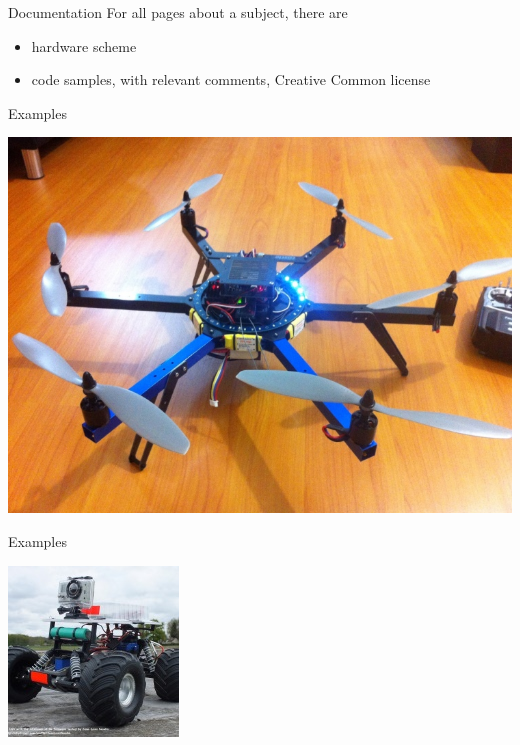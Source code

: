 \begin {frame} {Documentation}
	For all pages about a subject, there are
	\begin{itemize}
		\item hardware scheme
		\item code samples, with relevant comments, Creative Common license
	\end{itemize}
\end {frame}

\begin {frame} {Examples}
	\begin {center}
		\includegraphics [width=.7\textwidth,keepaspectratio] {img/drone}
	\end {center}
\end {frame}

\begin {frame} {Examples}
	\begin {center}
		\includegraphics [width=.5\textwidth,keepaspectratio] {img/rover}
	\end {center}
\end {frame}
